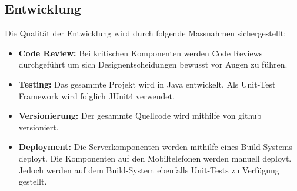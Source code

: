\subsection{Entwicklung}
Die Qualität der Entwicklung wird durch folgende Massnahmen sichergestellt:
\begin{itemize}
	\item{\textbf{Code Review:} Bei kritischen Komponenten werden Code Reviews durchgeführt um sich Designentscheidungen bewusst vor Augen zu führen.}
	
	\item{\textbf{Testing:} Das gesammte Projekt wird in Java entwickelt. Als Unit-Test Framework wird folglich JUnit4 verwendet.}
	
	\item{\textbf{Versionierung:} Der gesammte Quellcode wird mithilfe von github versioniert.}
	
	\item{\textbf{Deployment:} Die Serverkomponenten werden mithilfe eines Build Systems deployt. Die Komponenten auf den Mobiltelefonen werden manuell deployt. Jedoch werden auf dem Build-System ebenfalls Unit-Tests zu Verfügung gestellt.}
	
\end{itemize}